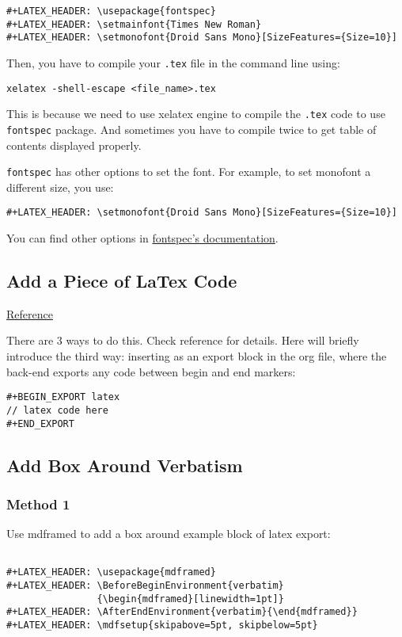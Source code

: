 \documentclass[11pt]{article}
\begin{document}
\begin{Verbatim}[frame=single]
#+LATEX_HEADER: \usepackage{fontspec}
#+LATEX_HEADER: \setmainfont{Times New Roman}
#+LATEX_HEADER: \setmonofont{Droid Sans Mono}[SizeFeatures={Size=10}]
\end{Verbatim}

Then, you have to compile your \texttt{.tex} file in the command line using:
\begin{Verbatim}[frame=single]
xelatex -shell-escape <file_name>.tex
\end{Verbatim}

This is because we need to use xelatex engine to compile the \texttt{.tex} code to use \texttt{fontspec} package. And sometimes you have to compile twice to get table of contents displayed properly.

\texttt{fontspec} has other options to set the font. For example, to set monofont a different size, you use:
\begin{Verbatim}[frame=single]
#+LATEX_HEADER: \setmonofont{Droid Sans Mono}[SizeFeatures={Size=10}]
\end{Verbatim}

You can find other options in \href{http://mirror.las.iastate.edu/tex-archive/macros/latex/contrib/fontspec/fontspec.pdf}{fontspec's documentation}.


\subsection{Add a Piece of LaTex Code}
\label{sec:org0725c99}
\href{https://orgmode.org/manual/Quoting-LaTeX-code.html}{Reference}

There are 3 ways to do this. Check reference for details. Here will briefly introduce the third way: inserting as an export block in the org file, where the back-end exports any code between begin and end markers:
\begin{Verbatim}[frame=single]
#+BEGIN_EXPORT latex
// latex code here
#+END_EXPORT
\end{Verbatim}



\subsection{Add Box Around Verbatism}
\label{sec:orgd038341}

\subsubsection{Method 1}
\label{sec:orgaffcd7a}
Use mdframed to add a box around example block of latex export:
\begin{Verbatim}[frame=single]

#+LATEX_HEADER: \usepackage{mdframed}
#+LATEX_HEADER: \BeforeBeginEnvironment{verbatim}
                {\begin{mdframed}[linewidth=1pt]}
#+LATEX_HEADER: \AfterEndEnvironment{verbatim}{\end{mdframed}}
#+LATEX_HEADER: \mdfsetup{skipabove=5pt, skipbelow=5pt}

\end{Verbatim}
\end{document}
